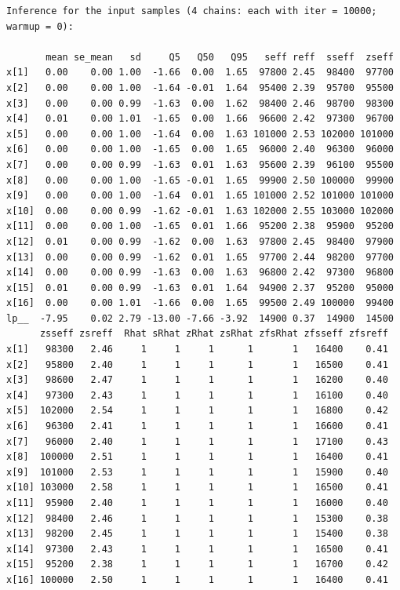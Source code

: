 \documentclass[american,]{article}
\begin{document}
\begin{verbatim}
Inference for the input samples (4 chains: each with iter = 10000; warmup = 0):

       mean se_mean   sd     Q5   Q50   Q95   seff reff  sseff  zseff
x[1]   0.00    0.00 1.00  -1.66  0.00  1.65  97800 2.45  98400  97700
x[2]   0.00    0.00 1.00  -1.64 -0.01  1.64  95400 2.39  95700  95500
x[3]   0.00    0.00 0.99  -1.63  0.00  1.62  98400 2.46  98700  98300
x[4]   0.01    0.00 1.01  -1.65  0.00  1.66  96600 2.42  97300  96700
x[5]   0.00    0.00 1.00  -1.64  0.00  1.63 101000 2.53 102000 101000
x[6]   0.00    0.00 1.00  -1.65  0.00  1.65  96000 2.40  96300  96000
x[7]   0.00    0.00 0.99  -1.63  0.01  1.63  95600 2.39  96100  95500
x[8]   0.00    0.00 1.00  -1.65 -0.01  1.65  99900 2.50 100000  99900
x[9]   0.00    0.00 1.00  -1.64  0.01  1.65 101000 2.52 101000 101000
x[10]  0.00    0.00 0.99  -1.62 -0.01  1.63 102000 2.55 103000 102000
x[11]  0.00    0.00 1.00  -1.65  0.01  1.66  95200 2.38  95900  95200
x[12]  0.01    0.00 0.99  -1.62  0.00  1.63  97800 2.45  98400  97900
x[13]  0.00    0.00 0.99  -1.62  0.01  1.65  97700 2.44  98200  97700
x[14]  0.00    0.00 0.99  -1.63  0.00  1.63  96800 2.42  97300  96800
x[15]  0.01    0.00 0.99  -1.63  0.01  1.64  94900 2.37  95200  95000
x[16]  0.00    0.00 1.01  -1.66  0.00  1.65  99500 2.49 100000  99400
lp__  -7.95    0.02 2.79 -13.00 -7.66 -3.92  14900 0.37  14900  14500
      zsseff zsreff  Rhat sRhat zRhat zsRhat zfsRhat zfsseff zfsreff
x[1]   98300   2.46     1     1     1      1       1   16400    0.41
x[2]   95800   2.40     1     1     1      1       1   16500    0.41
x[3]   98600   2.47     1     1     1      1       1   16200    0.40
x[4]   97300   2.43     1     1     1      1       1   16100    0.40
x[5]  102000   2.54     1     1     1      1       1   16800    0.42
x[6]   96300   2.41     1     1     1      1       1   16600    0.41
x[7]   96000   2.40     1     1     1      1       1   17100    0.43
x[8]  100000   2.51     1     1     1      1       1   16400    0.41
x[9]  101000   2.53     1     1     1      1       1   15900    0.40
x[10] 103000   2.58     1     1     1      1       1   16500    0.41
x[11]  95900   2.40     1     1     1      1       1   16000    0.40
x[12]  98400   2.46     1     1     1      1       1   15300    0.38
x[13]  98200   2.45     1     1     1      1       1   15400    0.38
x[14]  97300   2.43     1     1     1      1       1   16500    0.41
x[15]  95200   2.38     1     1     1      1       1   16700    0.42
x[16] 100000   2.50     1     1     1      1       1   16400    0.41

\end{verbatim}
\end{document}
